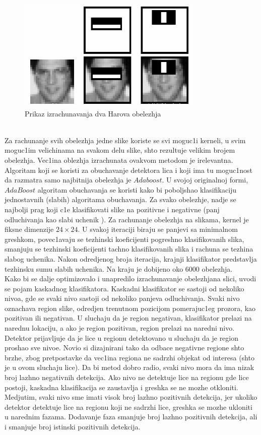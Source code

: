 \documentclass[a4paper, openany, oneside, 11pt]{book}
\begin{document}
\begin{figure}[h!]
\centering
  \includegraphics[scale=0.6]{res/haar_features.png}
  \caption{Prikaz izrachunavanja dva Harova obelezhja}
  \label{fig:2_2}
  \vspace{0pt}
\end{figure}\\
Za rachunanje svih obelezhja jedne slike koriste se svi moguc1i kerneli, u svim moguc1im velichinama na svakom delu slike, shto rezultuje velikim brojem obelezhja. Vec1ina oblezhja izrachunata ovakvom metodom je irelevantna. Algoritam koji se koristi za obuchavanje detektora lica i koji ima tu moguc1nost da razmatra samo najbitnija obelezhja je $Adaboost$. U svojoj originalnoj formi, $AdaBoost$ algoritam obuchavanja se koristi kako bi poboljshao klasifikaciju jednostavnih (slabih) algoritama obuchavanja. Za svako obelezhje, nadje se najbolji prag koji c1e klasifikovati slike na pozitivne i negativne  (panj odluchivanja kao slabi uchenik \cite{MUpredavanja}). Za rachunanje obelezhja na slikama, kernel je fiksne dimenzije $24\times24$. U svakoj iteraciji biraju se panjevi sa minimalnom greshkom, povec1avaju se tezhinski koeficijenti pogreshno klasifikovanih slika, smanjuju se tezhinski koeficijenti tachno klasifikovanih slika i rachuna se tezhina slabog uchenika. Nakon odredjenog broja iteracija, krajnji klasifikator predstavlja tezhinsku sumu slabih uchenika. Na kraju je dobijeno oko 6000 obelezhja.\\
Kako bi se dalje optimizovalo i unapredilo izrachunavanje obelezhjana slici, uvodi se pojam kaskadnog klasifikatora. Kaskadni klasifikator se sastoji od nekoliko nivoa, gde se svaki nivo sastoji od nekoliko panjeva odluchivanja. Svaki nivo oznachava region slike, odredjen trenutnom pozicijom pomerajuc1eg prozora, kao pozitivan ili negativan. U sluchaju da je region negativan, klasifikator prelazi na narednu lokaciju, a ako je region pozitivan, region prelazi na naredni nivo. Detektor prijavljuje da je lice u regionu detektovano u sluchaju da je region proshao sve nivoe. Novio si dizajnirani tako da odbace negativne regione shto brzhe, zbog pretpostavke da vec1ina regiona ne sadrzhi objekat od interesa (shto je u ovom sluchaju lice). Da bi metod dobro radio, svaki nivo mora da ima nizak broj lazhno negativnih detekcija. Ako nivo ne detektuje lice na regionu gde lice postoji, kaskadna klasifikacija se zaustavlja i greshka se ne mozhe otkloniti. Medjutim, svaki nivo sme imati visok broj lazhno pozitivnih detekcija, jer ukoliko detektor detektuje lice na regionu koji ne sadrzhi lice, greshka se mozhe ukloniti u narednim fazama. Dodavanje faza smanjuje broj lazhno pozitivnih detekcija, ali i smanjuje broj istinski pozitivnih detekcija.\\
\end{document}
